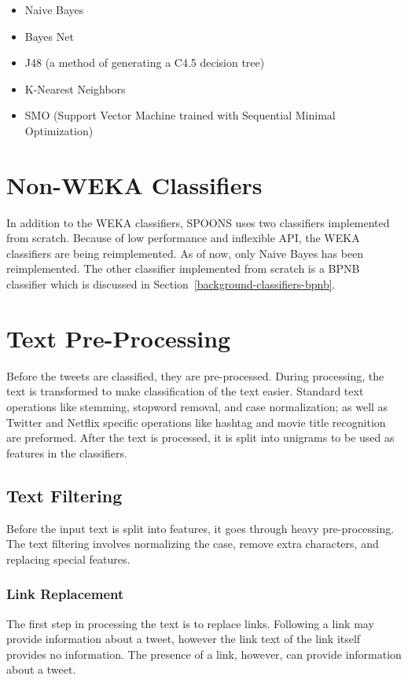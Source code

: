 \documentclass[12pt]{ucthesis}
\begin{document}
\begin{itemize}
   \item Naive Bayes
   \item Bayes Net
   \item J48 (a method of generating a C4.5 decision tree\cite{j48})
   \item K-Nearest Neighbors
   \item SMO (Support Vector Machine trained with Sequential Minimal Optimization\cite{smo})
\end{itemize}

\section{Non-WEKA Classifiers}
\label{class-nonweka}
In addition to the WEKA classifiers, SPOONS uses two classifiers implemented from scratch.
Because of low performance and inflexible API, the WEKA classifiers are being reimplemented.
As of now, only Naive Bayes has been reimplemented. The other classifier implemented from scratch is
a BPNB classifier which is discussed in Section~\ref{background-classifiers-bpnb}.

\section{Text Pre-Processing}
\label{class-processing}
Before the tweets are classified, they are pre-processed. During processing, the text is transformed
to make classification of the text easier. Standard text operations like stemming, stopword removal,
and case normalization; as well as Twitter and Netflix specific operations like hashtag and movie title
recognition are preformed. After the text is processed, it is split into unigrams to be used as features
in the classifiers.

\subsection{Text Filtering}
\label{class-filter}
Before the input text is split into features, it goes through heavy pre-processing.
The text filtering involves normalizing the case, remove extra characters, and replacing special features.

\subsubsection{Link Replacement}
\label{class-filter-link-replacement}
The first step in processing the text is to replace links.
Following a link may provide information about a tweet, however the link text of the link
itself provides no information. The presence of a link, however, can provide information about
a tweet.
\end{document}
